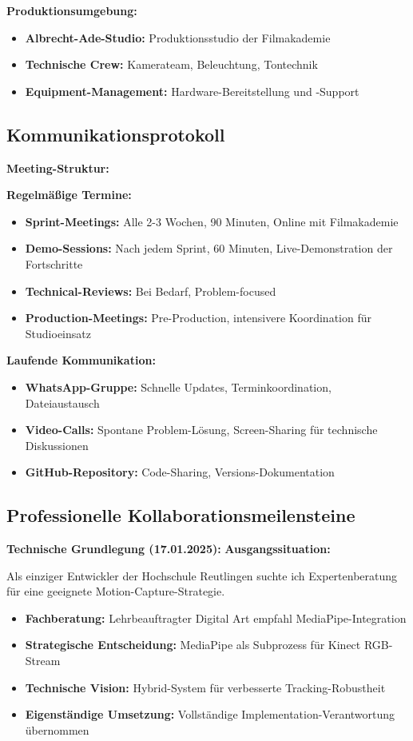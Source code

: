\textbf{Produktionsumgebung:}
\begin{itemize}
    \item \textbf{Albrecht-Ade-Studio:} Produktionsstudio der Filmakademie
    \item \textbf{Technische Crew:} Kamerateam, Beleuchtung, Tontechnik
    \item \textbf{Equipment-Management:} Hardware-Bereitstellung und -Support
\end{itemize}

\subsection{Kommunikationsprotokoll}

\textbf{Meeting-Struktur:}

\textbf{Regelmäßige Termine:}
\begin{itemize}
    \item \textbf{Sprint-Meetings:} Alle 2-3 Wochen, 90 Minuten, Online mit Filmakademie
    \item \textbf{Demo-Sessions:} Nach jedem Sprint, 60 Minuten, Live-Demonstration der Fortschritte
    \item \textbf{Technical-Reviews:} Bei Bedarf, Problem-focused
    \item \textbf{Production-Meetings:} Pre-Production, intensivere Koordination für Studioeinsatz
\end{itemize}

\textbf{Laufende Kommunikation:}
\begin{itemize}
    \item \textbf{WhatsApp-Gruppe:} Schnelle Updates, Terminkoordination, Dateiaustausch
    \item \textbf{Video-Calls:} Spontane Problem-Lösung, Screen-Sharing für technische Diskussionen
    \item \textbf{GitHub-Repository:} Code-Sharing, Versions-Dokumentation
\end{itemize}

\subsection{Professionelle Kollaborationsmeilensteine}

\textbf{Technische Grundlegung (17.01.2025):}
\textbf{Ausgangssituation:} \raggedright Als einziger Entwickler der Hochschule Reutlingen suchte ich Expertenberatung für eine geeignete Motion-Capture-Strategie.
\begin{itemize}
    \item \textbf{Fachberatung:} Lehrbeauftragter Digital Art empfahl MediaPipe-Integration
    \item \textbf{Strategische Entscheidung:} MediaPipe als Subprozess für Kinect RGB-Stream
    \item \textbf{Technische Vision:} Hybrid-System für verbesserte Tracking-Robustheit
    \item \textbf{Eigenständige Umsetzung:} Vollständige Implementation-Verantwortung übernommen
\end{itemize}


